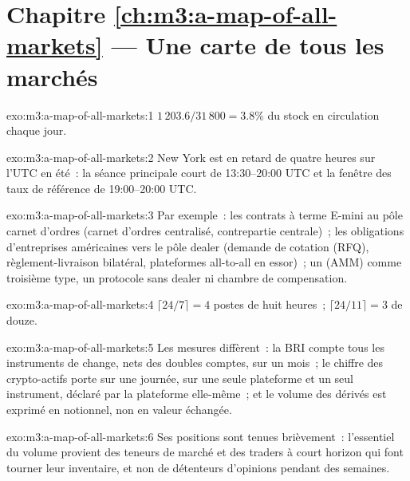 \section*{Chapitre \ref{ch:m3:a-map-of-all-markets} --- Une carte de tous les marchés}

\begin{solution}{exo:m3:a-map-of-all-markets:1}
$1\,203.6/31\,800 = 3.8\%$ du stock en circulation chaque jour.
\end{solution}

\begin{solution}{exo:m3:a-map-of-all-markets:2}
New York est en retard de quatre heures sur l'UTC en été~: la séance principale court de 13:30--20:00 UTC et la fenêtre des taux de référence de 19:00--20:00 UTC.
\end{solution}

\begin{solution}{exo:m3:a-map-of-all-markets:3}
Par exemple~: les contrats à terme E-mini au pôle carnet d'ordres (carnet d'ordres centralisé, contrepartie centrale)~; les obligations d'entreprises américaines vers le pôle dealer
(demande de cotation (RFQ), règlement-livraison bilatéral, plateformes all-to-all en essor)~; un  (AMM) comme troisième type, un protocole
sans dealer ni chambre de compensation.
\end{solution}

\begin{solution}{exo:m3:a-map-of-all-markets:4}
$\lceil 24/7 \rceil = 4$ postes de huit heures~; $\lceil 24/11 \rceil = 3$ de douze.
\end{solution}

\begin{solution}{exo:m3:a-map-of-all-markets:5}
Les mesures diffèrent~: la BRI compte tous les instruments de change, nets des doubles comptes, sur un mois~; le chiffre des crypto-actifs porte sur une
journée, sur une seule plateforme et un seul instrument, déclaré par la plateforme elle-même~; et le volume des dérivés est exprimé en notionnel, non en valeur échangée.
\end{solution}

\begin{solution}{exo:m3:a-map-of-all-markets:6}
Ses positions sont tenues brièvement~: l'essentiel du volume provient des teneurs de marché et des traders à court horizon qui font tourner
leur inventaire, et non de détenteurs d'opinions pendant des semaines.
\end{solution}

